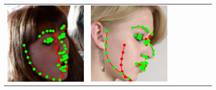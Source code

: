 \begin{figure}[t!]
\begin{center}
\begin{tabular}{ @{\hskip 1.5mm}c@{\hskip 1.5mm}c@{\hskip 1.5mm}c@{\hskip 1.5mm}c@{}c@{}c@{}c@{\hskip 1.5mm}c@{}}
\includegraphics[width=\AlignFigWid]{img/results/AFLW2000/_pred_AFLW2000_landmarkoverlay_1159.png} &
\includegraphics[width=\AlignFigWid]{img/results/AFLW2000/_pred_AFLW2000_landmarkoverlay_450.png} &

\end{tabular}
\end{center}
\end{figure}
